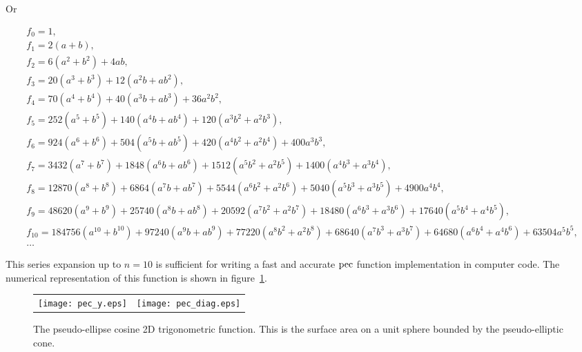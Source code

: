 Or
\begin{footnotesize}
\begin{gather}
    f_0 = 1 , \nonumber \\
    f_1 = 2(a + b) , \nonumber \\
    f_2 = 6(a^2 + b^2) + 4ab , \nonumber \\
    f_3 = 20(a^3 + b^3) + 12(a^2b + ab^2) , \nonumber \\
    f_4 = 70(a^4 + b^4) + 40(a^3b + ab^3) + 36a^2b^2 , \nonumber \\
    f_5 = 252(a^5 + b^5) + 140(a^4b + ab^4) + 120(a^3b^2 + a^2b^3) , \nonumber \\
    f_6 = 924(a^6 + b^6) + 504(a^5b + ab^5) + 420(a^4b^2 + a^2b^4) + 400a^3b^3 , \nonumber \\
    f_7 = 3432(a^7 + b^7) + 1848(a^6b + ab^6) + 1512(a^5b^2 + a^2b^5) + 1400(a^4b^3 + a^3b^4) , \nonumber \\
    f_8 = 12870(a^8 + b^8) + 6864(a^7b + ab^7) + 5544(a^6b^2 + a^2b^6) + 5040(a^5b^3 + a^3b^5) + 4900a^4b^4 , \nonumber \\
    f_9 = 48620(a^9 + b^9) + 25740(a^8b + ab^8) + 20592(a^7b^2 + a^2b^7) + 18480(a^6b^3 + a^3b^6) + 17640(a^5b^4 + a^4b^5) , \nonumber \\
    f_{10} = 184756(a^{10} + b^{10}) + 97240(a^9b + ab^9) + 77220(a^8b^2 + a^2b^8) + 68640(a^7b^3 + a^3b^7) + 64680(a^6b^4 + a^4b^6) + 63504a^5b^5 , \nonumber \\
    \dots
\end{gather}
\end{footnotesize}

This series expansion up to $n = 10$ is sufficient for writing a fast and accurate $\operatorname{pec}$ function implementation in computer code.
The numerical representation of this function is shown in figure~\ref{fig: pec function}.

\begin{figure}
\centering
  \begin{tabular}{@{}cc@{}}
    \texttt{[image: pec\_y.eps]} &
    \texttt{[image: pec\_diag.eps]}
  \end{tabular}
  \caption[Pseudo-ellipse cosine 2D trigonometric function.]{
    The pseudo-ellipse cosine 2D trigonometric function.
    This is the surface area on a unit sphere bounded by the pseudo-elliptic cone.
  }
  \label{fig: pec function}
\end{figure}



